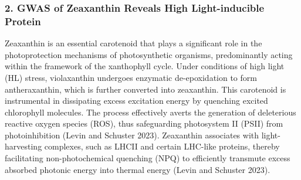 \documentclass[10pt,letterpaper]{article}
\begin{document}
\begin{itemize}


\subsubsection*{2. GWAS of Zeaxanthin Reveals High Light-inducible Protein}

Zeaxanthin is an essential carotenoid that plays a significant role in the photoprotection mechanisms of photosynthetic organisms, predominantly acting within the framework of the xanthophyll cycle. Under conditions of high light (HL) stress, violaxanthin undergoes enzymatic de-epoxidation to form antheraxanthin, which is further converted into zeaxanthin. This carotenoid is instrumental in dissipating excess excitation energy by quenching excited chlorophyll molecules. The process effectively averts the generation of deleterious reactive oxygen species (ROS), thus safeguarding photosystem II (PSII) from photoinhibition (Levin and Schuster 2023). Zeaxanthin associates with light-harvesting complexes, such as LHCII and certain LHC-like proteins, thereby facilitating non-photochemical quenching (NPQ) to efficiently transmute excess absorbed photonic energy into thermal energy (Levin and Schuster 2023).


\end{itemize}
\end{document}
